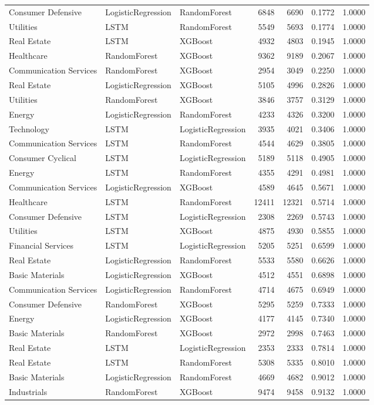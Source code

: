 \begin{longtable}{lllrrrr}
Consumer Defensive & LogisticRegression & RandomForest & 6848 & 6690 & 0.1772 & 1.0000 \\
Utilities & LSTM & RandomForest & 5549 & 5693 & 0.1774 & 1.0000 \\
Real Estate & LSTM & XGBoost & 4932 & 4803 & 0.1945 & 1.0000 \\
Healthcare & RandomForest & XGBoost & 9362 & 9189 & 0.2067 & 1.0000 \\
Communication Services & RandomForest & XGBoost & 2954 & 3049 & 0.2250 & 1.0000 \\
Real Estate & LogisticRegression & XGBoost & 5105 & 4996 & 0.2826 & 1.0000 \\
Utilities & RandomForest & XGBoost & 3846 & 3757 & 0.3129 & 1.0000 \\
Energy & LogisticRegression & RandomForest & 4233 & 4326 & 0.3200 & 1.0000 \\
Technology & LSTM & LogisticRegression & 3935 & 4021 & 0.3406 & 1.0000 \\
Communication Services & LSTM & RandomForest & 4544 & 4629 & 0.3805 & 1.0000 \\
Consumer Cyclical & LSTM & LogisticRegression & 5189 & 5118 & 0.4905 & 1.0000 \\
Energy & LSTM & RandomForest & 4355 & 4291 & 0.4981 & 1.0000 \\
Communication Services & LogisticRegression & XGBoost & 4589 & 4645 & 0.5671 & 1.0000 \\
Healthcare & LSTM & RandomForest & 12411 & 12321 & 0.5714 & 1.0000 \\
Consumer Defensive & LSTM & LogisticRegression & 2308 & 2269 & 0.5743 & 1.0000 \\
Utilities & LSTM & XGBoost & 4875 & 4930 & 0.5855 & 1.0000 \\
Financial Services & LSTM & LogisticRegression & 5205 & 5251 & 0.6599 & 1.0000 \\
Real Estate & LogisticRegression & RandomForest & 5533 & 5580 & 0.6626 & 1.0000 \\
Basic Materials & LogisticRegression & XGBoost & 4512 & 4551 & 0.6898 & 1.0000 \\
Communication Services & LogisticRegression & RandomForest & 4714 & 4675 & 0.6949 & 1.0000 \\
Consumer Defensive & RandomForest & XGBoost & 5295 & 5259 & 0.7333 & 1.0000 \\
Energy & LogisticRegression & XGBoost & 4177 & 4145 & 0.7340 & 1.0000 \\
Basic Materials & RandomForest & XGBoost & 2972 & 2998 & 0.7463 & 1.0000 \\
Real Estate & LSTM & LogisticRegression & 2353 & 2333 & 0.7814 & 1.0000 \\
Real Estate & LSTM & RandomForest & 5308 & 5335 & 0.8010 & 1.0000 \\
Basic Materials & LogisticRegression & RandomForest & 4669 & 4682 & 0.9012 & 1.0000 \\
Industrials & RandomForest & XGBoost & 9474 & 9458 & 0.9132 & 1.0000 \\
\end{longtable}
